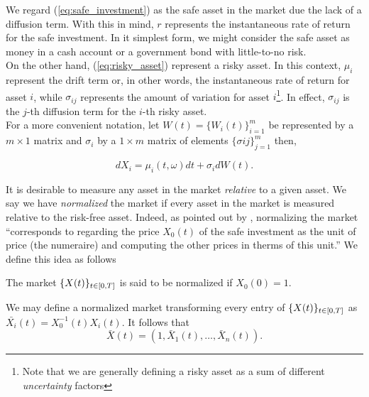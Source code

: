 \documentclass[../TGMAFFIRO.tex]{subfiles}
\begin{document}
We regard (\ref{eq:safe_investment}) as the safe asset in the market due the lack of a diffusion term. With this in mind, $r$ represents the instantaneous rate of return for the safe investment. In it simplest form, we might consider the safe asset as money in a cash account or a government bond with little-to-no risk.\\

On the other hand, (\ref{eq:risky_asset}) represent a risky asset. In this context, $\mu_i$ represent the drift term or, in other words, the instantaneous rate of return for asset $i$, while $\sigma_{ij}$ represents the amount of variation for asset $i$\footnote{Note that we are generally defining a risky asset as a sum of different \textit{uncertainty} factors}. In effect, $\sigma_{ij}$ is the $j$-th diffusion term for the $i$-th risky asset.\\

For a more convenient notation, let $W(t) = \{W_i(t)\}_{i=1}^{m}$ be represented by a $m\times 1$ matrix and $\sigma_i$ by a $1\times m$ matrix of elements $\{\sigma{ij}\}_{j=1}^{m}$ then,

\begin{equation}
  dX_i = \mu_i(t,\omega) dt + \sigma_idW(t).
\end{equation}


It is desirable to measure any asset in the market \textit{relative} to a given asset. We say we have \textit{normalized} the market if every asset in the market is measured relative to the risk-free asset. Indeed, as pointed out by , normalizing the market ``corresponds to regarding the price $X_0(t)$ of the safe investment as the unit of price (the numeraire) and computing the other prices in therms of this unit.''
 We define this idea as follows
\begin{definition}
	The market $\{X(t)\}_{t\in[0,T]}$ is said to be normalized if $X_0(0)= 1$.
\end{definition}

We may define a normalized market transforming every entry of $\{X(t)\}_{t\in[0,T]}$ as $\bar{X_i}(t) = X_0^{-1}(t)X_i(t)$. It follows that
\begin{equation}
  \bar{X}(t) = (1, \bar{X}_1(t), \ldots, \bar{X}_n(t)).
\end{equation}
\end{document}

